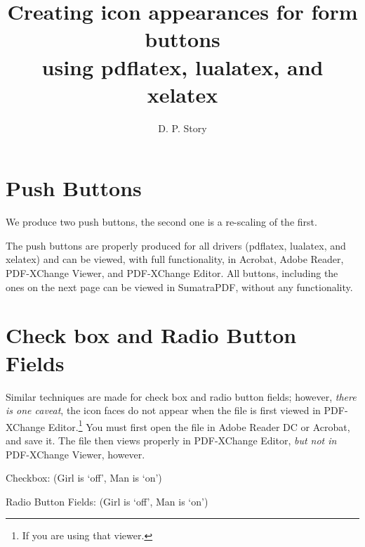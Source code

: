 \documentclass{article}
\title{Creating icon appearances for form buttons\texorpdfstring{\\}{}
  using \textsf{pdflatex}, \textsf{lualatex}, and \textsf{xelatex}}
\author{D. P. Story}
\begin{document}
\maketitle

\section{Push Buttons}

We produce two push buttons, the second one is a re-scaling of the first.\medskip

\noindent{}
\qquad
{}\vcgBdry[12pt]

\noindent The push buttons are properly produced for all drivers
(\textsf{pdflatex}, \textsf{lualatex}, and \textsf{xelatex}) and can be
viewed, with full functionality, in \textsf{Acrobat}, \textsf{Adobe Reader},
\textsf{PDF-XChange Viewer}, and \textsf{PDF-XChange Editor}. All buttons, including
the ones on the next page can be viewed in \textsf{SumatraPDF}, without any functionality.

\newpage

\section{Check box and Radio Button Fields}

Similar techniques are made for check box and radio button fields;
however, \emph{there is one caveat}, the icon faces do not appear when the
file is first viewed in \textsf{PDF-XChange Editor}.\footnote{If you are
using that viewer.} You must first open the file in \textsf{Adobe Reader DC}
or \textsf{Acrobat}, and save it. The file then views properly in
\textsf{PDF-XChange Editor}, \emph{but not in} \textsf{PDF-XChange Viewer},
however.\vcgBdry[6pt]

Checkbox:
\quad(Girl is `off', Man is `on')\vcgBdry[6pt]

Radio Button Fields: \quad {}\quad{}\quad(Girl is `off', Man is `on')\vcgBdry[6pt]

\vcgBdry[6pt]
\end{document}
